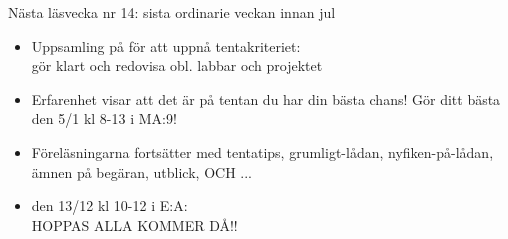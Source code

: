 \begin{Slide}{Nästa läsvecka nr 14: sista ordinarie veckan innan jul}

  \begin{itemize}
    \item Uppsamling på  för att uppnå tentakriteriet: \\ gör klart och redovisa  obl. labbar och projektet

    \item Erfarenhet visar att det är på   tentan du har din bästa chans! Gör ditt bästa den 5/1 kl 8-13 i MA:9!

    \item Föreläsningarna fortsätter med tentatips, grumligt-lådan, nyfiken-på-lådan, ämnen på begäran, utblick, OCH ...

    \item {}  den 13/12 kl 10-12 i E:A: \\ HOPPAS ALLA KOMMER DÅ!!
  \end{itemize}

\end{Slide}



\fi
